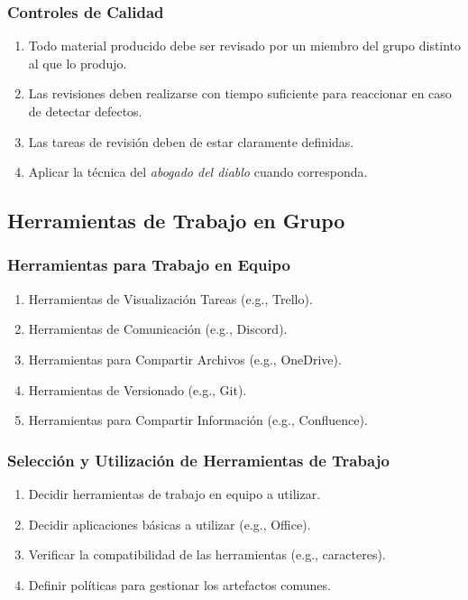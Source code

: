 \documentclass[handout,a4paper,t,xcolor=pst,dvips]{beamer}
\begin{document}
\begin{frame}[c]
	\frametitle{Controles de Calidad}
	\begin{enumerate}[<+->]
		\item Todo material producido debe ser revisado por un miembro del grupo distinto al que lo produjo.
		\item Las revisiones deben realizarse con tiempo suficiente para reaccionar en caso de detectar defectos.
		\item Las tareas de revisión deben de estar claramente definidas.
		\item Aplicar la técnica del \emph{abogado del diablo} cuando corresponda.
	\end{enumerate}
\end{frame}

\subsection{Herramientas de Trabajo en Grupo}

\begin{frame}[c]
	\frametitle{Herramientas para Trabajo en Equipo}
	\begin{enumerate}[<+->]
		\item Herramientas de Visualización Tareas (e.g., Trello).
		\item Herramientas de Comunicación (e.g., Discord).
		\item Herramientas para Compartir Archivos (e.g., OneDrive).
		\item Herramientas de Versionado (e.g., Git).
		\item Herramientas para Compartir Información (e.g., Confluence).
	\end{enumerate}
\end{frame}

\begin{frame}[c]
	\frametitle{Selección y Utilización de Herramientas de Trabajo}
	\begin{enumerate}[<+->]
		\item Decidir herramientas de trabajo en equipo a utilizar.
		\item Decidir aplicaciones básicas a utilizar (e.g., Office). 
		\item Verificar la compatibilidad de las herramientas (e.g., caracteres).
		\item Definir políticas para gestionar los artefactos comunes.
	\end{enumerate}
\end{frame}
\end{document}
